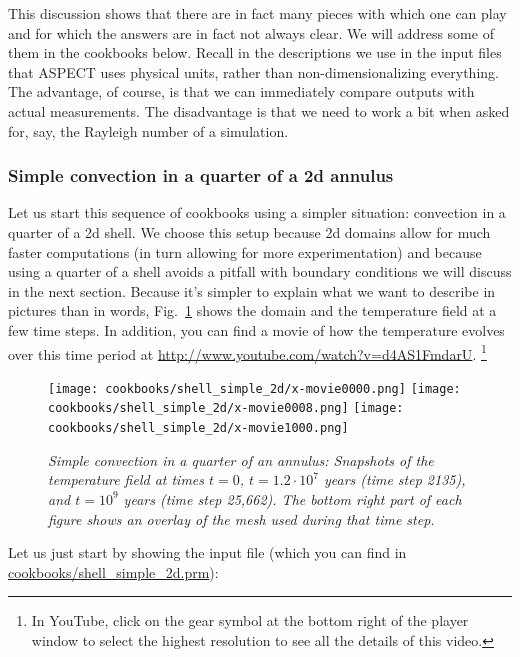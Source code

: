 \documentclass{article}
\newcommand{\aspect}{\textsc{ASPECT}}
\begin{document}
This discussion shows that there are in fact many pieces with which one can play
and for which the answers are in fact not always clear. We will address some of
them in the cookbooks below. Recall in the descriptions we use in the input
files that \aspect{} uses physical units, rather than non-dimensionalizing
everything. The advantage, of course, is that we can immediately compare outputs
with actual measurements. The disadvantage is that we need to work a bit when
asked for, say, the Rayleigh number of a simulation.


\subsubsection{Simple convection in a quarter of a 2d annulus}
\label{sec:shell-simple-2d}

Let us start this sequence of cookbooks using a simpler situation: convection in
a quarter of a 2d shell. We choose this setup because 2d domains allow for much
faster computations (in turn allowing for more experimentation) and because
using a quarter of a shell avoids a pitfall with boundary conditions we will
discuss in the next section. Because it's simpler to explain what we want to
describe in pictures than in words, Fig.~\ref{fig:simple-shell-2d} shows the
domain and the temperature field at a few time steps. In addition, you can find
a movie of how the temperature evolves over this time period at
\url{http://www.youtube.com/watch?v=d4AS1FmdarU}.%
\footnote{In YouTube, click on the gear symbol at the bottom right of the
player window to select the highest resolution to see all the details of this
video.}

\begin{figure}[tb]
\texttt{[image: cookbooks/shell\_simple\_2d/x-movie0000.png]}
\hfill
\texttt{[image: cookbooks/shell\_simple\_2d/x-movie0008.png]}
\hfill
\texttt{[image: cookbooks/shell\_simple\_2d/x-movie1000.png]}
\caption{\it Simple convection in a quarter of an annulus: Snapshots of the
temperature field at times $t=0$, $t=1.2\cdot 10^7$ years (time step 2135), and
$t=10^9$ years (time step 25,662). The bottom right part of each figure shows an
overlay of the mesh used during that time step.}
\label{fig:simple-shell-2d}
\end{figure}

Let us just start by showing the input file (which you can find in
\url{cookbooks/shell_simple_2d.prm}):


\end{document}
